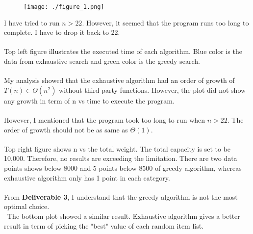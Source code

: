 \documentclass[11pt]{article}
\begin{document}
\begin{enumerate}
	\begin{figure}[h]
	\texttt{[image: ./figure\_1.png]}
	\end{figure}
	
	I have tried to run $n>22$. However, it seemed that the program runs too long to complete. I have to drop it back to 22. \\\\
	Top left figure illustrates the executed time of each algorithm. Blue color is the data from exhaustive search and green color is the greedy search. \\\\
	My analysis showed that the exhaustive algorithm had an order of growth of $T(n) \in \Theta (n^2)$ without third-party functions. However, the plot did not show any growth in term of n vs time to execute the program.\\\\
	However, I mentioned that the program took too long to run when $n>22$. The order of growth should not be as same as $\Theta (1)$. \\\\
	Top right figure shows n vs the total weight. The total capacity is set to be 10,000. Therefore, no results are exceeding the limitation. There are two data points shows below 8000 and 5 points below 8500 of greedy algorithm, whereas exhaustive algorithm only has 1 point in each category.\\\\
	From \textbf{Deliverable 3}, I understand that the greedy algorithm is not the most optimal choice.\\\
	The bottom plot showed a similar result. Exhaustive algorithm gives a better result in term of picking the "best" value of each random item list.
	 
\end{enumerate}
\end{document}
